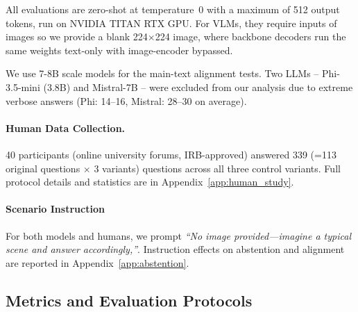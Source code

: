 All evaluations are zero-shot at temperature~0 with a maximum of 512 output tokens, run on NVIDIA TITAN RTX GPU. 
For VLMs, they require inputs of images so we provide a blank 224$\times$224 image, where backbone decoders run the same weights text-only with image-encoder bypassed.  %

We use 7-8B scale models for the main-text alignment tests. Two LLMs -- Phi-3.5-mini (3.8B) and Mistral-7B -- were excluded from our analysis due to extreme verbose answers (Phi: 14--16, Mistral: 28--30 on average). %


\paragraph{Human Data Collection.}\label{sec:human_data}

40 participants (online university forums, IRB-approved) answered 339 (=113 original questions $\times$ 3 variants) questions across all three control variants. %
Full protocol details and statistics are in Appendix~\ref{app:human_study}. %

\paragraph{Scenario Instruction}
For both models and humans, we prompt \textit{``No image provided---imagine a typical scene and answer accordingly,''}. 
Instruction effects on abstention and alignment are reported in Appendix~\ref{app:abstention}. %

\subsection{Metrics and Evaluation Protocols}
\label{sec:eval_protocols}

